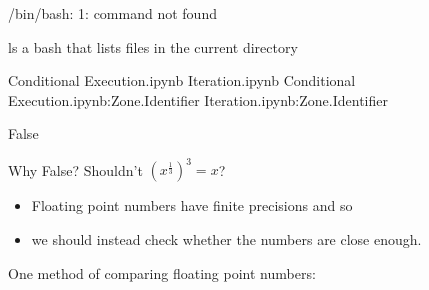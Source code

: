 \documentclass[letterpaper,10pt,english]{sphinxmanual}
\begin{document}
\begin{sphinxVerbatim}[commandchars=\\\{\}]
  
\end{sphinxVerbatim}

\begin{sphinxVerbatim}[commandchars=\\\{\}]
/bin/bash: 1: command not found
\end{sphinxVerbatim}

\begin{sphinxVerbatim}[commandchars=\\\{\}]
ls  \PYGZsh{} a bash  that lists files in the current directory
\end{sphinxVerbatim}

\begin{sphinxVerbatim}[commandchars=\\\{\}]
\PYGZsq{}Conditional Execution.ipynb\PYGZsq{}		        Iteration.ipynb
\PYGZsq{}Conditional Execution.ipynb:Zone.Identifier\PYGZsq{}   Iteration.ipynb:Zone.Identifier
\end{sphinxVerbatim}


\begin{sphinxVerbatim}[commandchars=\\\{\}]
  
  
  
\end{sphinxVerbatim}

\begin{sphinxVerbatim}[commandchars=\\\{\}]
False
\end{sphinxVerbatim}

Why False? Shouldn’t \((x^{\frac13})^3=x\)?
\begin{itemize}
\item {} 
Floating point numbers have finite precisions and so

\item {} 
we should instead check whether the numbers are close enough.

\end{itemize}

One method of comparing floating point numbers:
\end{document}
